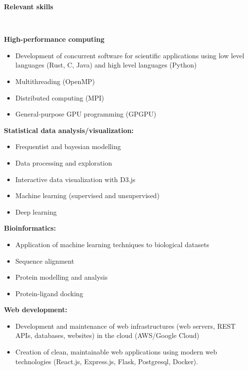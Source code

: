 \documentclass[11pt]{article}
\newcommand{\header}[1]{\begin{center}{\large \sc \bf #1}\end{center}\\}
\begin{document}
\header{Relevant skills}
\nopagebreak

\textbf{High-performance computing}
\begin{itemize}
  \item Development of concurrent software for scientific applications using low level languages (Rust, C, Java) and high level languages (Python)
  \item Multithreading (OpenMP)
  \item Distributed computing (MPI)
  \item General-purpose GPU programming (GPGPU)
\end{itemize}

\textbf{Statistical data analysis/visualization:}
\begin{itemize}
  \item Frequentist and bayesian modelling
  \item Data processing and exploration
  \item Interactive data visualization with D3.js
	\item Machine learning (supervised and unsupervised)
	\item Deep learning
\end{itemize}


\textbf{Bioinformatics:}
\begin{itemize}
  \item Application of machine learning techniques to biological datasets
  \item Sequence alignment
  \item Protein modelling and analysis
	\item Protein-ligand docking
\end{itemize}


\textbf{Web development:}
\begin{itemize}
  \item Development and maintenance of web infrastructures (web servers, REST APIs, databases, websites) in the cloud (AWS/Google Cloud)
	\item Creation of clean, maintainable web applications using modern web technologies (React.js, Express.js, Flask, Postgresql, Docker).
\end{itemize}
\end{document}
